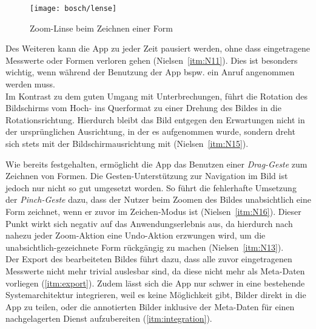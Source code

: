 \begin{wrapfigure}{R}{0.5\textwidth}
  \centering
  \texttt{[image: bosch/lense]}
  \caption{Zoom-Linse beim Zeichnen einer Form}
  \label{fig:blense}
\end{wrapfigure}

Des Weiteren kann die App zu jeder Zeit pausiert werden, ohne dass eingetragene Messwerte oder Formen verloren gehen (Nielsen~\autoref{itm:N11}). 
Dies ist besonders wichtig, wenn während der Benutzung der App bspw. ein Anruf angenommen werden muss. \\

Im Kontrast zu dem guten Umgang mit Unterbrechungen, führt die Rotation des Bildschirms vom Hoch- ins Querformat zu einer Drehung des Bildes in die Rotationsrichtung.
Hierdurch bleibt das Bild entgegen den Erwartungen nicht in der ursprünglichen Ausrichtung, in der es aufgenommen wurde, sondern dreht sich stets mit der Bildschirmausrichtung mit (Nielsen~\autoref{itm:N15}). \\

Wie bereits festgehalten, ermöglicht die App das Benutzen einer \emph{Drag-Geste} zum Zeichnen von Formen.
Die Gesten-Unterstützung zur Navigation im Bild ist jedoch nur nicht so gut umgesetzt worden.
So führt die fehlerhafte Umsetzung der \emph{Pinch-Geste} dazu, dass der Nutzer beim Zoomen des Bildes unabsichtlich eine Form zeichnet, wenn er zuvor im Zeichen-Modus ist (Nielsen~\autoref{itm:N16}).
Dieser Punkt wirkt sich negativ auf das Anwendungserlebnis aus, da hierdurch nach nahezu jeder Zoom-Aktion eine Undo-Aktion erzwungen wird, um die unabsichtlich-gezeichnete Form rückgängig zu machen (Nielsen~\autoref{itm:N13}). \\

Der Export des bearbeiteten Bildes führt dazu, dass alle zuvor eingetragenen Messwerte nicht mehr trivial auslesbar sind, da diese nicht mehr als Meta-Daten vorliegen (\autoref{itm:export}).
Zudem lässt sich die App nur schwer in eine bestehende Systemarchitektur integrieren, weil es keine Möglichkeit gibt, Bilder direkt in die App zu teilen, oder die annotierten Bilder inklusive der Meta-Daten für einen nachgelagerten Dienst aufzubereiten (\autoref{itm:integration}). \\

